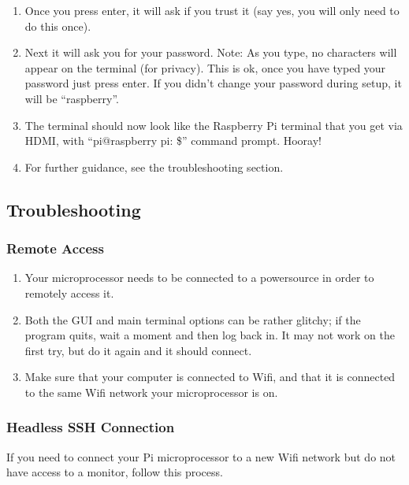 \documentclass{article}\usepackage[]{graphicx}\usepackage[]{color}
\begin{document}
\begin{enumerate}
\item Once you press enter, it will ask if you trust it (say yes, you will only need to do this once). 

\item Next it will ask you for your password.  Note: As you type, no characters will appear on the terminal (for privacy).  This is ok, once you have typed your password just press enter.  If you didn't change your password during setup, it will be ``raspberry''.

\item The terminal should now look like the Raspberry Pi terminal that you get via HDMI, with ``pi@raspberry pi: \$'' command prompt.  Hooray!

\item For further guidance, see the troubleshooting section.

\end{enumerate}

\subsection{Troubleshooting}

\subsubsection{Remote Access}

\begin{enumerate}

\item Your microprocessor needs to be connected to a powersource in order to remotely access it.

\item Both the GUI and main terminal options can be rather glitchy; if the program quits, wait a moment and then log back in.  It may not work on the first try, but do it again and it should connect.

\item Make sure that your computer is connected to Wifi, and that it is connected to the same Wifi network your microprocessor is on.

\end{enumerate}

\subsubsection{Headless SSH Connection}

If you need to connect your Pi microprocessor to a new Wifi network but do not have access to a monitor, follow this process. 
\end{document}
